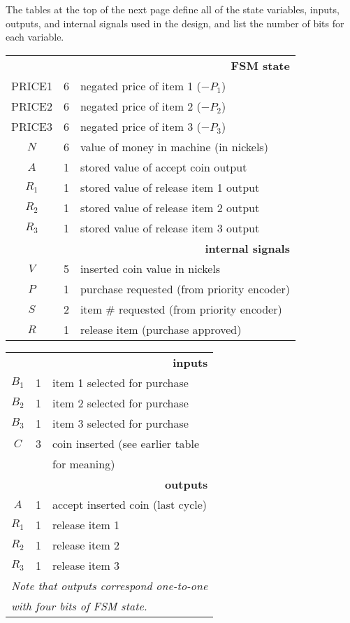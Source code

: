 The tables at the top of the next page define all of the state variables,
inputs, outputs, and internal signals used in the design, and list the
number of bits for each variable.

\pagebreak

\begin{minipage}{3.7in}
\begin{tabular}{|ccl|}\hline
\multicolumn{3}{|r|}{{\bf FSM state}}\\
PRICE1& 6& negated price of item 1 ($-P_1$)\\
PRICE2& 6& negated price of item 2 ($-P_2$)\\
PRICE3& 6& negated price of item 3 ($-P_3$)\\
$N$& 6& value of money in machine (in nickels)\\
$A$& 1& stored value of accept coin output\\
$R_1$& 1& stored value of release item 1 output\\
$R_2$& 1& stored value of release item 2 output\\
$R_3$& 1& stored value of release item 3 output\\ \hline
\multicolumn{3}{|r|}{{\bf internal signals}}\\
$V$& 5& inserted coin value in nickels\\
$P$& 1& purchase requested (from priority encoder)\\
$S$& 2& item \# requested (from priority encoder)\\
$R$& 1& release item (purchase approved)\\ \hline
\end{tabular}
\end{minipage}\hspace{0.15in}\begin{minipage}{2.65in}
\begin{tabular}{|ccl|}\hline
\multicolumn{3}{|r|}{{\bf inputs}}\\
$B_1$& 1& item 1 selected for purchase\\
$B_2$& 1& item 2 selected for purchase\\
$B_3$& 1& item 3 selected for purchase\\
$C$& 3& coin inserted (see earlier table\\ 
& & for meaning)\\ \hline
\multicolumn{3}{|r|}{{\bf outputs}}\\
$A$& 1& accept inserted coin (last cycle)\\
$R_1$& 1& release item 1\\
$R_2$& 1& release item 2\\
$R_3$& 1& release item 3\\
\multicolumn{3}{|l|}{{\em Note that outputs correspond one-to-one}}\\
\multicolumn{3}{|l|}{{\em with four bits of FSM state.}}\\ \hline
\end{tabular}
\end{minipage}\vspace{12pt}


